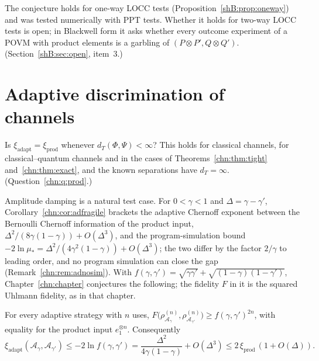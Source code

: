 \noindent The conjecture holds for one-way LOCC tests (Proposition~\ref{shB:prop:oneway}) and was tested numerically with PPT tests. Whether it holds for two-way LOCC tests is open; in Blackwell form it asks whether every outcome experiment of a POVM with product elements is a garbling of $(P\otimes P',Q\otimes Q')$. (Section~\ref{shB:sec:open}, item~3.)

\section{Adaptive discrimination of channels}\label{op:sec:discrimination}

\begin{question}\label{op:q:prod}
Is $\xi_{\mathrm{adapt}}=\xi_{\mathrm{prod}}$ whenever $d_T(\Phi,\Psi)<\infty$? This holds for classical channels, for classical--quantum channels \cite{SalekHayashiWinter2022} and in the cases of Theorems~\ref{chn:thm:tight} and~\ref{chn:thm:exact}, and the known separations \cite{HHLW2010,SalekHayashiWinter2022} have $d_T=\infty$. (Question~\ref{chn:q:prod}.)
\end{question}

Amplitude damping is a natural test case. For $0<\gamma<1$ and $\Delta=\gamma-\gamma'$, Corollary~\ref{chn:cor:adfragile} brackets the adaptive Chernoff exponent between the Bernoulli Chernoff information of the product input, $\Delta^2/(8\gamma(1-\gamma))+O(\Delta^3)$, and the program-simulation bound $-2\ln\mu_*=\Delta^2/(4\gamma^2(1-\gamma))+O(\Delta^3)$; the two differ by the factor $2/\gamma$ to leading order, and no program simulation can close the gap (Remark~\ref{chn:rem:adnosim}). With $f(\gamma,\gamma')=\sqrt{\gamma\gamma'}+\sqrt{(1-\gamma)(1-\gamma')}$, Chapter~\ref{chn:chapter} conjectures the following; the fidelity $F$ in it is the squared Uhlmann fidelity, as in that chapter.

\begin{conjecture}\label{op:conj:adfid}
For every adaptive strategy with $n$ uses, $F\big(\rho^{(n)}_{\mathcal A_\gamma},\rho^{(n)}_{\mathcal A_{\gamma'}}\big)\ge f(\gamma,\gamma')^{2n}$, with equality for the product input $e_1^{\otimes n}$. Consequently
\[
\xi_{\mathrm{adapt}}(\mathcal A_\gamma,\mathcal A_{\gamma'})\le-2\ln f(\gamma,\gamma')=\frac{\Delta^2}{4\gamma(1-\gamma)}+O(\Delta^3)\le2\,\xi_{\mathrm{prod}}\,(1+O(\Delta)).
\]
\end{conjecture}

